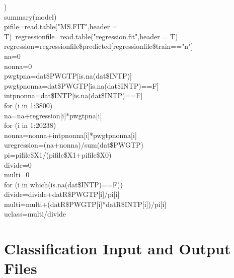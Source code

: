 \documentclass[12pt]{article}
\begin{document}
)\\
summary(model)\\
pifile=read.table("MS.FIT",header = T)\
regressionfile=read.table("regression.fit",header = T)\\
regression=regressionfile\$predicted[regressionfile\$train=="n"]\\
na=0\\
nonna=0\\
pwgtpna=dat\$PWGTP[is.na(dat\$INTP)]\\
pwgtpnonna=dat\$PWGTP[is.na(dat\$INTP)==F]\\
intpnonna=dat\$INTP[is.na(dat\$INTP)==F]\\
for (i in 1:3800) {\\
  na=na+regression[i]*pwgtpna[i]\\
}
for (i in 1:20238) {\\
  nonna=nonna+intpnonna[i]*pwgtpnonna[i]\\
}
uregression=(na+nonna)/sum(dat\$PWGTP)\\
pi=pifile\$X1/(pifile\$X1+pifile\$X0)\\
divide=0\\
multi=0\\
for (i in which(is.na(dat\$INTP)==F)) {\\
  divide=divide+datR\$PWGTP[i]/pi[i]\\
  multi=multi+(datR\$PWGTP[i]*datR\$INTP[i])/pi[i]\\
}
uclass=multi/divide\\
\section{Classification Input and Output Files}
\end{document}
